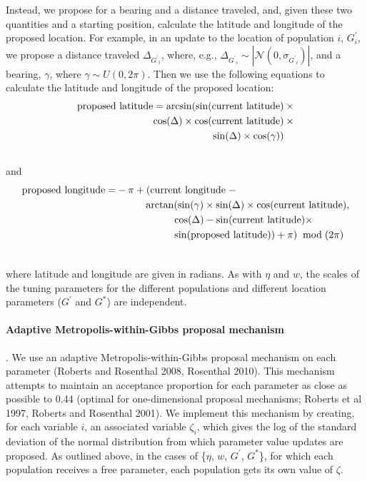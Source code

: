 \documentclass[12pt]{article}
\newcommand{\identifyadmixsource}[1]{{#1^{*}}}
\begin{document}
Instead, we propose for a bearing and a distance traveled, and, given these two quantities and a starting position, calculate the latitude and longitude of the proposed location.  For example, in an update to the location of population $i$, $G^{\prime}_i$, we propose a distance traveled $\Delta_{{G^{\prime}}_i}$, where, e.g., $\Delta_{{G^{\prime}}_i}  \sim | \mathcal{N}(0,\sigma_{{G^{\prime}}_i})|$, and a bearing, $\gamma$, where $\gamma \sim U(0,2\pi)$.  Then we use the following equations to calculate the latitude and longitude of the proposed location:
\begin{align}
\text{proposed latitude} = \arcsin(\sin(\text{current latitude}) \: &\times\\  \notag
					\cos(\Delta) \times \cos(\text{current latitude}) \:&\times\\  \notag
					\sin(\Delta) \times \cos(\gamma))   \:&\phantom{\times}\\  \notag
\end{align}
and
\begin{align}
\text{proposed longitude} = & - \pi + (\text{current longitude} \; - \\ \notag
					 	&\hspace{1cm} \arctan(
							\sin(\gamma) \times
							\sin(\Delta) \times
							\cos(\text{current latitude}) , \\ \notag
						& \hspace{2cm} \cos(\Delta) - 
							\sin(\text{current latitude}) \times \\ \notag
						& \hspace{2cm} \sin(\text{proposed latitude})) + \pi) \; \bmod (2\pi) \\ \notag
\end{align}

where latitude and longitude are given in radians.  As with $\eta$ and $w$, the scales of the tuning parameters for the different populations and different location parameters ($G^{\prime}$ and $\identifyadmixsource{G}$) are independent.


\paragraph{Adaptive Metropolis-within-Gibbs proposal mechanism }.
We use an adaptive Metropolis-within-Gibbs proposal mechanism on each parameter (Roberts and Rosenthal 2008, Rosenthal 2010).  This mechanism attempts to maintain an acceptance proportion for each parameter as close as possible to 0.44 (optimal for one-dimensional proposal mechanisms; Roberts et al 1997, Roberts and Rosenthal 2001).  We implement this mechanism by creating, for each variable $i$, an associated variable $\zeta_i$, which gives the log of the standard deviation of the normal distribution from which parameter value updates are proposed.  As outlined above, in the cases of \{$\eta$, $w$, $G^{\prime}$, $\identifyadmixsource{G}$\}, for which each population receives a free parameter, each population gets its own value of $\zeta$.  
\end{document}
